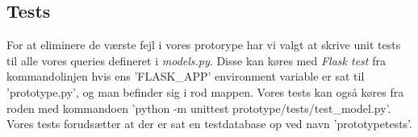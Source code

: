 \subsection{Tests}
For at eliminere de værste fejl i vores protorype har vi valgt at skrive unit tests til alle vores queries defineret i \textit{models.py}. Disse kan køres med \textit{Flask test} fra kommandolinjen hvis ens 'FLASK\_APP' environment variable er sat til 'prototype.py', og man befinder sig i rod mappen. Vores tests kan også køres fra roden med kommandoen 'python -m unittest prototype/tests/test\_model.py'.\\
Vores tests forudsætter at der er sat en testdatabase op ved navn 'prototypetests'.